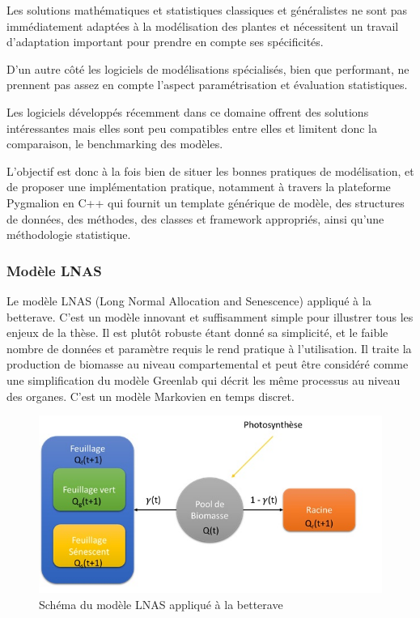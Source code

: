 Les solutions mathématiques et statistiques classiques et généralistes ne sont pas immédiatement adaptées à la modélisation des plantes et nécessitent un travail d’adaptation important pour prendre en compte ses spécificités.

D’un autre côté les logiciels de modélisations spécialisés, bien que performant, ne prennent pas assez en compte l’aspect paramétrisation et évaluation statistiques.

Les logiciels développés récemment dans ce domaine offrent des solutions intéressantes mais elles sont peu compatibles entre elles et limitent donc la comparaison, le benchmarking des modèles.

L’objectif est donc à la fois bien de situer les bonnes pratiques de modélisation, et de proposer une implémentation pratique, notamment à travers la plateforme Pygmalion en C++ qui fournit un template générique de modèle, des structures de données, des méthodes, des classes et framework appropriés, ainsi qu’une méthodologie statistique.

\subsubsection{Modèle LNAS}

Le modèle LNAS (Long Normal Allocation and Senescence) appliqué à la betterave. C’est un modèle innovant et suffisamment simple pour illustrer tous les enjeux de la thèse. Il est plutôt robuste étant donné sa simplicité, et le faible nombre de données et paramètre requis le rend pratique à l’utilisation. Il traite la production de biomasse au niveau compartemental et peut être considéré comme une simplification du modèle Greenlab qui décrit les même processus au niveau des organes.
C’est un modèle Markovien en temps discret.

\begin{figure}[h]
	\begin{center}
	
	
  \includegraphics[scale=1.0]{./img/sBeetRoot.jpg}
  \caption{Schéma du modèle LNAS appliqué à la betterave}
  \label{fig:sBeetRoot}
  
  \end{center}
\end{figure}

